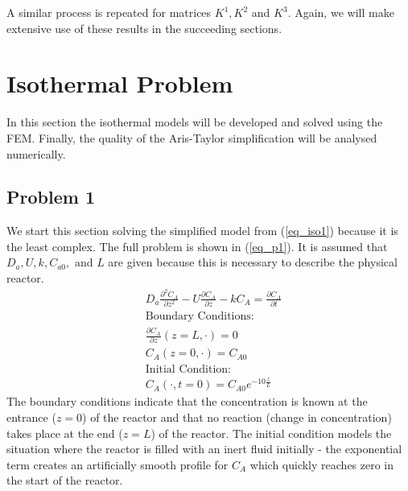 \documentclass[11pt,fleqn]{article}
\theoremstyle{defstyle}
\begin{document}
A similar process is repeated for matrices $K^1, K^2$ and $K^3$. Again, we will make extensive use of these results in the succeeding sections.

\section{Isothermal Problem}
In this section the isothermal models will be developed and solved using the FEM. Finally, the quality of the Aris-Taylor simplification will be analysed numerically.  
\subsection{Problem 1}
\label{section_isop1}
We start this section solving the simplified model from (\ref{eq_iso1}) because it is the least complex. The full problem is shown in (\ref{eq_p1}). It is assumed that $D_a, U, k, C_{a0},\text{ and } L$ are given because this is necessary to describe the physical reactor.  
\begin{equation}
\begin{aligned}
&D_a \frac{\partial^2 C_A}{\partial z^2} - U \frac{\partial C_A}{\partial z} - kC_A = 
\frac{\partial C_A}{\partial t} \\
&\text{Boundary Conditions:} \\
&\frac{\partial C_A}{\partial z}(z=L, \cdot) = 0\\
&C_A(z=0, \cdot) = C_{A0} \\
&\text{Initial Condition:} \\
& C_A(\cdot, t= 0) = C_{A0}e^{-10\frac{z}{L}}
\end{aligned}
\label{eq_p1}
\end{equation}
The boundary conditions indicate that the concentration is known at the entrance ($z=0$) of the reactor and that no reaction (change in concentration) takes place at the end ($z=L$) of the reactor. The initial condition models the situation where the reactor is filled with an inert fluid initially - the exponential term creates an artificially smooth profile for $C_{A}$ which quickly reaches zero in the start of the reactor. 
\end{document}
